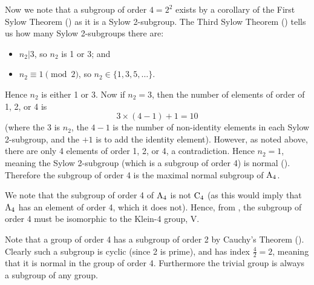 \begin{questions}
    Now we note that a subgroup of order $4 = 2^2$ exists by a corollary of the First Sylow Theorem () as it is a Sylow 2-subgroup. The Third Sylow Theorem () tells us how many Sylow 2-subgroups there are:
    \begin{itemize}
        \item $n_2 \vert 3$, so $n_2$ is 1 or 3; and
        \item $n_2 \equiv 1 \pmod2$, so $n_2 \in \{1, 3, 5, \dots\}$.
    \end{itemize}
    Hence $n_2$ is either 1 or 3. Now if $n_2 = 3$, then the number of elements of order of 1, 2, or 4 is
    \[
        3 \times (4 - 1) + 1 = 10
    \]
    (where the 3 is $n_2$, the $4-1$ is the number of non-identity elements in each Sylow 2-subgroup, and the $+1$ is to add the identity element). However, as noted above, there are only 4 elements of order 1, 2, or 4, a contradiction. Hence $n_2 = 1$, meaning the Sylow 2-subgroup (which is a subgroup of order 4) is normal (). Therefore the subgroup of order 4 is the maximal normal subgroup of $\mathrm{A}_{4}$.

    We note that the subgroup of order 4 of $\mathrm{A}_{4}$ is not $\mathrm{C}_{4}$ (as this would imply that $\mathrm{A}_{4}$ has an element of order 4, which it does not). Hence, from , the subgroup of order 4 must be isomorphic to the Klein-4 group, $\mathrm{V}$.

    Note that a group of order 4 has a subgroup of order 2 by Cauchy's Theorem (). Clearly such a subgroup is cyclic (since 2 is prime), and has index $\frac42 = 2$, meaning that it is normal in the group of order 4. Furthermore the trivial group is always a subgroup of any group.


\end{questions}
